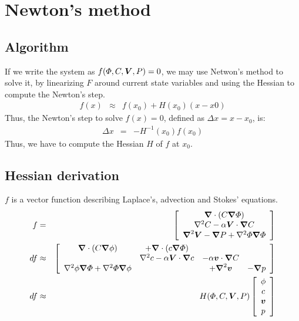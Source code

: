 \section{Newton's method}
\subsection{Algorithm}
If we write the system as $f(\varPhi,C,\boldsymbol{V},P) = 0$, we may use Netwon's method to solve it, by linearizing $F$ around current state variables
and using the Hessian to compute the Newton's step.
\begin{eqnarray}
  f(x) &\approx & f(x_0) + H(x_0) (x - x0)
\end{eqnarray}
Thus, the Newton's step to solve $f(x) = 0$,
defined as $\Delta x = x - x_0$, is:
\begin{eqnarray}
  \Delta x &=& -H^{-1}(x_0) f(x_0)
\end{eqnarray}
Thus, we have to compute the Hessian $H$ of $f$ at $x_0$.

\subsection{Hessian derivation}
$f$ is a vector function describing Laplace's, advection and Stokes'
equations.
\begin{eqnarray}
  f &=& \left[\begin{array}{c}
  \boldsymbol{\nabla} \cdot (C \boldsymbol{\nabla} \varPhi) \\
  \nabla^2 C - \alpha \boldsymbol{V} \cdot \boldsymbol{\nabla} C \\
  \boldsymbol{\nabla}^2 \boldsymbol{V} - \boldsymbol{\nabla} P + \nabla^2 \varPhi \boldsymbol{\nabla} \varPhi
  \end{array}\right]
  \\
  df & \approx & \left[\begin{array}{cccc}
  \boldsymbol{\nabla} \cdot (C \boldsymbol{\nabla} \phi) &+ \boldsymbol{\nabla} \cdot (c \boldsymbol{\nabla} \varPhi) & & \\
  &\nabla^2 c - \alpha \boldsymbol{V} \cdot \boldsymbol{\nabla} c &- \alpha \boldsymbol{v} \cdot \boldsymbol{\nabla} C&\\
  \nabla^2 \phi \boldsymbol{\nabla} \varPhi +
  \nabla^2 \varPhi \boldsymbol{\nabla} \phi &
  & +\boldsymbol{\nabla}^2 \boldsymbol{v} &- \boldsymbol{\nabla} p
  \end{array}\right] \\
  df & \approx & H(\varPhi,C,\boldsymbol{V},P) \left[\begin{array}{c}
  \phi \\ c \\ \boldsymbol{v} \\ p
  \end{array}\right]
\end{eqnarray}

